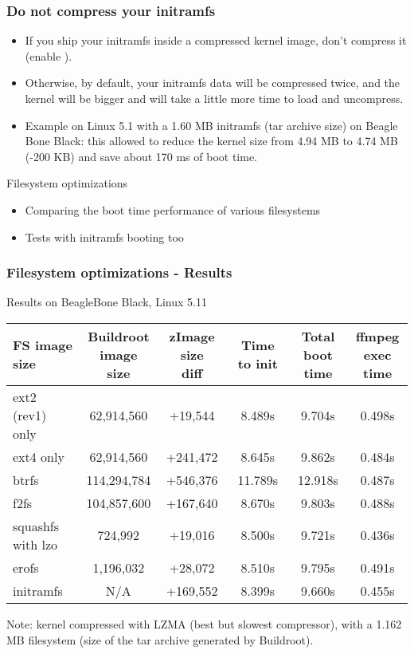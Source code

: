 \begin{frame}
\frametitle{Do not compress your initramfs}
\begin{itemize}
\item If you ship your initramfs inside a compressed kernel image, don't compress
      it \\
      (enable ).
\item Otherwise, by default, your initramfs data will be compressed twice, and
      the kernel will be bigger and will take a little more time to load
      and uncompress.
\item Example on Linux 5.1 with a 1.60 MB initramfs (tar archive size)
      on Beagle Bone Black: this allowed to reduce the kernel size from 4.94
      MB to 4.74 MB (-200 KB) and save about 170 ms of boot time.
\end{itemize}
\end{frame}

\setuplabframe
{Filesystem optimizations}
{
\begin{itemize}
\item Comparing the boot time performance of various filesystems
\item Tests with initramfs booting too
\end{itemize}
}

\begin{frame}
\frametitle{Filesystem optimizations - Results}
Results on BeagleBone Black, Linux 5.11
\small
\begin{tabular}{| l || c | c | c | c | c |}
\hline
FS image size & \makecell{Buildroot\\ image size} & \makecell{zImage
size\\ diff} & Time to init & \makecell{Total\\ boot time} & \makecell{ffmpeg\\ exec
time}\\
\hline
ext2 (rev1) only & 62,914,560 & +19,544 & 8.489s & 9.704s & 0.498s \\
\hline
ext4 only & 62,914,560 & +241,472 & 8.645s & 9.862s & 0.484s \\
\hline
btrfs & 114,294,784 & +546,376 & 11.789s & 12.918s & 0.487s \\
\hline
f2fs & 104,857,600 & +167,640 & 8.670s & 9.803s & 0.488s \\
\hline
squashfs with lzo & 724,992 & +19,016 & 8.500s & 9.721s & 0.436s \\
\hline
erofs & 1,196,032 & +28,072 & 8.510s & 9.795s & 0.491s \\
\hline
initramfs & N/A & +169,552 & 8.399s & 9.660s & 0.455s \\
\hline
\end{tabular}
\vfill
Note:  kernel compressed with LZMA (best but slowest
compressor), with a 1.162 MB filesystem (size of the tar archive
generated by Buildroot).
\end{frame}

